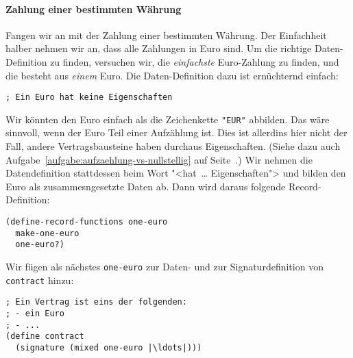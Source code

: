 \paragraph{Zahlung einer bestimmten Währung}
Fangen wir an mit der Zahlung einer bestimmten Währung.  Der
Einfachheit halber nehmen wir an, dass alle Zahlungen in Euro sind.
Um die richtige Daten-Definition zu finden, versuchen wir, die
\emph{einfachste} Euro-Zahlung zu finden, und die besteht aus
\emph{einem} Euro.  Die Daten-Definition dazu ist ernüchternd einfach:
%
\begin{lstlisting}
; Ein Euro hat keine Eigenschaften
\end{lstlisting}
%
Wir könnten den Euro einfach als die Zeichenkette \lstinline{"EUR"}
abbilden.  Das wäre sinnvoll, wenn der Euro Teil einer Aufzählung ist.
Dies ist allerdins hier nicht der Fall, andere Vertragsbausteine haben
durchaus Eigenschaften.  (Siehe dazu auch
Aufgabe~\ref{aufgabe:aufzaehlung-vs-nullstellig} auf
Seite~\pageref{aufgabe:aufzaehlung-vs-nullstellig}.)  Wir nehmen die
Datendefinition stattdessen beim Wort "<hat~\ldots{} Eigenschaften">
und bilden den Euro als zusammesngesetzte Daten ab.  Dann wird daraus
folgende Record-Definition:
%
\begin{lstlisting}
(define-record-functions one-euro
  make-one-euro
  one-euro?)
\end{lstlisting}
%
Wir fügen als nächstes \lstinline{one-euro} zur Daten- und zur
Signaturdefinition von \lstinline{contract} hinzu:
%
\begin{lstlisting}
; Ein Vertrag ist eins der folgenden:
; - ein Euro
; - ...
(define contract
  (signature (mixed one-euro |\ldots|)))
\end{lstlisting}
%
